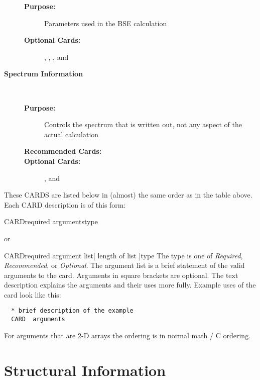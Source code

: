 \documentclass[11pt]{report}
\begin{document}
\begin{description}
  \begin{description}
  \item[\textbf{Purpose:}] Parameters used in the BSE calculation
  \item[\textbf{Optional Cards:}]   
    ,
    ,
    ,
    and 
  \end{description}
\item[\large\textbf{Spectrum Information}]\dotfill\
  \begin{description}
  \item[\textbf{Purpose:}] Controls the spectrum that is written out, not any aspect of the actual calculation
  \item[\textbf{Recommended Cards:}]   
   \item[\textbf{Optional Cards:}]   
    ,
    and 
  \end{description}   
\end{description}

These CARDS are listed below in (almost) the same order as in the table above.
Each CARD description is of this form:

\begin{Card}{CARD}{required arguments}{type}{}
\end{Card}
or \\
\begin{Card}{CARD}{required argument list[ length of list ]}{type}{}
  The type is one of \textsl{Required}, \textsl{Recommended}, or
  \textsl{Optional}. The argument list is a brief statement of the
  valid arguments to the card. Arguments in square brackets are 
  optional. The text description explains the arguments and 
  their uses more fully. Example uses of the card look like this:
\begin{verbatim}
  * brief description of the example
  CARD  arguments
\end{verbatim}

For arguments that are 2-D arrays the ordering is in normal math / C ordering.
\end{Card}



\section{Structural Information}
\label{sec:Structural-Information}
\end{document}
